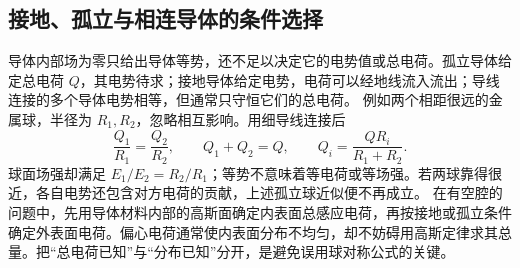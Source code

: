 \subsection{接地、孤立与相连导体的条件选择}
导体内部场为零只给出导体等势，还不足以决定它的电势值或总电荷。孤立导体给定总电荷 $Q$，其电势待求；接地导体给定电势，电荷可以经地线流入流出；导线连接的多个导体电势相等，但通常只守恒它们的总电荷。
例如两个相距很远的金属球，半径为 $R_1,R_2$，忽略相互影响。用细导线连接后
\[
 \frac{Q_1}{R_1}=\frac{Q_2}{R_2},\qquad Q_1+Q_2=Q,
 \qquad Q_i=\frac{QR_i}{R_1+R_2}.
\]
球面场强却满足 $E_1/E_2=R_2/R_1$；等势不意味着等电荷或等场强。若两球靠得很近，各自电势还包含对方电荷的贡献，上述孤立球近似便不再成立。
在有空腔的问题中，先用导体材料内部的高斯面确定内表面总感应电荷，再按接地或孤立条件确定外表面电荷。偏心电荷通常使内表面分布不均匀，却不妨碍用高斯定律求其总量。把“总电荷已知”与“分布已知”分开，是避免误用球对称公式的关键。

